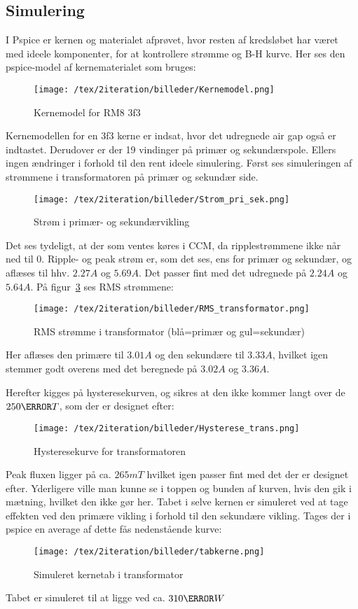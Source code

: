 \subsection{Simulering}
I Pspice er kernen og materialet afprøvet, hvor resten af kredsløbet har været med ideele komponenter, for at kontrollere strømme og B-H kurve. Her ses den pspice-model af kernematerialet som bruges:
\begin{figure}[H]
	\center
	\texttt{[image: /tex/2iteration/billeder/Kernemodel.png]}
	\caption{Kernemodel for RM8 3f3}
	\label{fig: Kernemodel}
\end{figure}
Kernemodellen for en 3f3 kerne er indsat, hvor det udregnede air gap også er indtastet. Derudover er der 19 vindinger på primær og sekundærspole. Ellers ingen ændringer i forhold til den rent ideele simulering. Først ses simuleringen af strømmene i transformatoren på primær og sekundær side.
\begin{figure}[H]
	\center
	\texttt{[image: /tex/2iteration/billeder/Strom\_pri\_sek.png]}
	\caption{Strøm i primær- og sekundærvikling}
	\label{fig: prisek_strom}
\end{figure}
Det ses tydeligt, at der som ventes køres i CCM, da ripplestrømmene ikke når ned til 0. Ripple- og peak strøm er, som det ses, ens for primær og sekundær, og aflæses til hhv. $2.27A$ og $5.69A$. Det passer fint med det udregnede på $2.24A$ og $5.64A$.
På figur~\ref{fig: RMS_trans} ses RMS strømmene:
\begin{figure}[H]
	\center
	\texttt{[image: /tex/2iteration/billeder/RMS\_transformator.png]}
	\caption{RMS strømme i transformator (blå=primær og gul=sekundær)}
	\label{fig: RMS_trans}
\end{figure}
Her aflæses den primære til $3.01A$ og den sekundære til $3.33A$, hvilket igen stemmer godt overens med det beregnede på $3.02A$ og $3.36A$.


\noindent Herefter kigges på hysteresekurven, og sikres at den ikke kommer langt over de $250\milli T$, som der er designet efter:
\begin{figure}[H]
	\center
	\texttt{[image: /tex/2iteration/billeder/Hysterese\_trans.png]}
	\caption{Hysteresekurve for transformatoren}
	\label{fig: Hysterese_trans}
\end{figure}
Peak fluxen ligger på ca. $265mT$ hvilket igen passer fint med det der er designet efter. Yderligere ville man kunne se i toppen og bunden af kurven, hvis den gik i mætning, hvilket den ikke gør her.
Tabet i selve kernen er simuleret ved at tage effekten ved den primære vikling i forhold til den sekundære vikling. Tages der i pspice en average af dette fås nedenstående kurve:
\begin{figure}[H]
	\center
	\texttt{[image: /tex/2iteration/billeder/tabkerne.png]}
	\caption{Simuleret kernetab i transformator}
	\label{fig: Kernetab}
\end{figure}
Tabet er simuleret til at ligge ved ca. $310\milli W$

